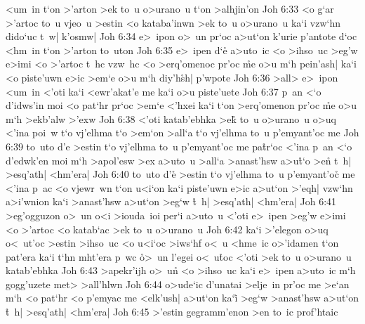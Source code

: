 <um~in
t`on
>'arton
>ek
to~u
o>urano~u
t`on
>alhjin'on\bibvsend
\vs Joh 6:33
<o
g`ar
>'artoc
to~u
vjeo~u
>estin
<o
kataba'inwn
>ek
to~u
o>urano~u
ka`i
vzw`hn
dido`uc
t~w|
k'osmw|\bibvsend
\vs Joh 6:34
e>~ipon
o>~un
pr`oc
a>ut`on
k'urie
p'antote
d`oc
<hm~in
t`on
>'arton
to~uton\bibvsend
\vs Joh 6:35
e>~ipen
d`e\r{}
a>uto~ic
<o
>ihso~uc
>eg'w
e>imi
<o
>'artoc
t~hc
vzw~hc
<o
>erq'omenoc
pr'oc
\r{m}e
o>u
m`h
pein'ash|
ka`i
<o
piste'uwn
e>ic
>em`e
o>u
m`h
diy'h\r{s}h|
p'wpote\bibvsend
\vs Joh 6:36
>all>
e>~ipon
<um~in
<'oti
ka`i
<ewr'akat'e
me
ka`i
o>u
piste'uete\bibvsend
\vs Joh 6:37
p~an
<`o
d'idws'in
moi
<o
pat`hr
pr`oc
>em`e
<'hxei
ka`i
t`on
>erq'omenon
pr'oc
\r{m}e
o>u
m`h
>ekb'alw
>'exw\bibvsend
\vs Joh 6:38
<'oti
katab'ebhka
>e\r{k}
to~u
o>urano~u
o>uq
<'ina
poi~w
t`o
vj'elhma
t`o
>em`on
>all`a
t`o
vj'elhma
to~u
p'emyant'oc
me\bibvsend
\vs Joh 6:39
to~uto
d'e
>estin
t`o
vj'elhma
to~u
p'emyant'oc
me
pa\r{t}r`oc
<'ina
p~an
<`o
d'edwk'en
moi
m`h
>apol'esw
>ex
a>uto~u
>all`a
>anast'hsw
a>u\r{t}`o
>e\r{n}
t~h|
>esq'ath|
<hm'era|\bibvsend
\vs Joh 6:40
to~uto
d'e\r{}
>estin
t`o
vj'elhma
to~u
p'emyant'oc\r{}
me
<'ina
p~ac
<o
vjewr~wn
t`on
u<i`on
ka`i
piste'uwn
e>ic
a>ut`on
>'eqh|
vzw`hn
a>i'wnion
ka`i
>anast'hsw
a>ut`on
>eg`w
\r{t}~h|
>esq'ath|
<hm'era|\bibvsend
\vs Joh 6:41
>eg'ogguzon
o>~un
o<i
>iouda~ioi
per`i
a>uto~u
<'oti
e>~ipen
>eg'w
e>imi
<o
>'artoc
<o
katab`ac
>ek
to~u
o>urano~u\bibvsend
\vs Joh 6:42
ka`i
>'elegon
o>uq
o<~ut'oc
>estin
>ihso~uc
<o
u<i`oc
>iws`hf
o<~u
<hme~ic
o>'idamen
t`on
pat'era
ka`i
t`hn
mht'era
p~wc
\r{o}>~un
l'egei
o<~u\r{t}oc
<'oti
>ek
to~u
o>urano~u
katab'ebhka\bibvsend
\vs Joh 6:43
>apekr'ijh
o>~un\r{}
<o
>ihso~uc
ka`i
e>~ipen
a>uto~ic
m`h
gogg'uzete
met>
>all'hlwn\bibvsend
\vs Joh 6:44
o>ude`ic
d'unatai
>elje~in
pr'oc
me
>e`an
m`h
<o
pat`hr
<o
p'emyac
me
<elk'ush|
a>ut`on
ka`i\r{}
>eg`w
>anast'hsw
a>ut`on
\r{t}~h|
>esq'ath|
<hm'era|\bibvsend
\vs Joh 6:45
>'estin
gegramm'enon
>en
to~ic
prof'htaic
